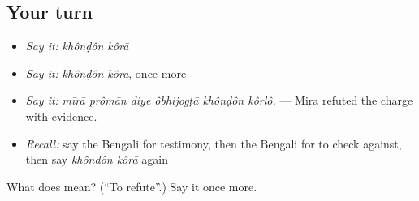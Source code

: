 \subsection*{Your turn}
\begin{itemize}
\raggedright
  \item \emph{Say it:} \emph{khônḍôn kôrā}
  \item \emph{Say it:} \emph{khônḍôn kôrā}, once more
  \item \emph{Say it:} \emph{mīrā prômān diye ôbhijogṭā khônḍôn kôrlô.} — Mira refuted the charge with evidence.
  \item \emph{Recall:} say the Bengali for testimony, then the Bengali for to check against, then say \emph{khônḍôn kôrā} again
\end{itemize}

\begin{tcolorbox}[breakable,colback=teal!4,colframe=teal!35!black,title={Before you move on}]
What does   mean? (\textquotedblleft{}To refute\textquotedblright{}.) Say it once more.
\end{tcolorbox}

